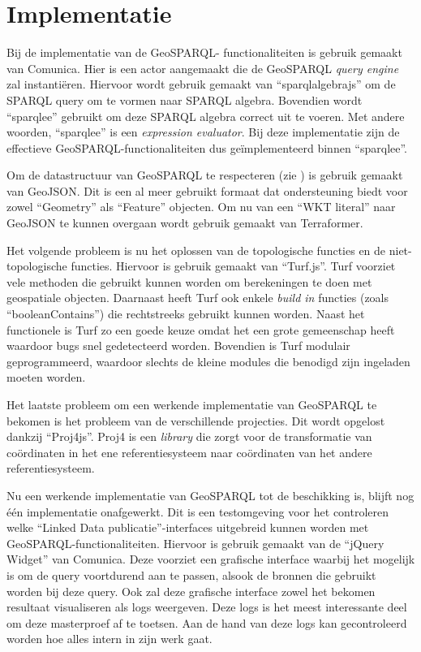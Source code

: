 \documentclass[twocolumn]{phdsymp} %
\begin{document}
\section{Implementatie}
Bij de implementatie van de GeoSPARQL- functionaliteiten is gebruik gemaakt van Comunica. Hier is een actor aangemaakt die de GeoSPARQL \textit{query engine} zal instantiëren. Hiervoor wordt gebruik gemaakt van ``sparqlalgebrajs'' om de SPARQL query om te vormen naar SPARQL algebra. Bovendien wordt ``sparqlee'' gebruikt om deze SPARQL algebra correct uit te voeren. Met andere woorden, ``sparqlee'' is een \textit{expression evaluator}. Bij deze implementatie zijn de effectieve GeoSPARQL-functionaliteiten dus geïmplementeerd binnen ``sparqlee''. 

Om de datastructuur van GeoSPARQL te respecteren (zie ) is gebruik gemaakt van GeoJSON. Dit is een al meer gebruikt formaat dat ondersteuning biedt voor zowel ``Geometry'' als ``Feature'' objecten. Om nu van een ``WKT literal'' naar GeoJSON te kunnen overgaan wordt gebruik gemaakt van Terraformer. 

Het volgende probleem is nu het oplossen van de topologische functies en de niet-topologische functies. Hiervoor is gebruik gemaakt van ``Turf.js''. Turf voorziet vele methoden die gebruikt kunnen worden om berekeningen te doen met geospatiale objecten. Daarnaast heeft Turf ook enkele \textit{build in} functies (zoals ``booleanContains'') die rechtstreeks gebruikt kunnen worden. Naast het functionele is Turf zo een goede keuze omdat het een grote gemeenschap heeft waardoor bugs snel gedetecteerd worden. Bovendien is Turf modulair geprogrammeerd, waardoor slechts de kleine modules die benodigd zijn ingeladen moeten worden. 

Het laatste probleem om een werkende implementatie van GeoSPARQL te bekomen is het probleem van de verschillende projecties. Dit wordt opgelost dankzij ``Proj4js''. Proj4 is een \textit{library} die zorgt voor de transformatie van coördinaten in het ene referentiesysteem naar coördinaten van het andere referentiesysteem. 

Nu een werkende implementatie van GeoSPARQL tot de beschikking is, blijft nog één implementatie onafgewerkt. Dit is een testomgeving voor het controleren welke ``Linked Data publicatie''-interfaces uitgebreid kunnen worden met GeoSPARQL-functionaliteiten. Hiervoor is gebruik gemaakt van de ``jQuery Widget'' van Comunica. Deze voorziet een grafische interface waarbij het mogelijk is om de query voortdurend aan te passen, alsook de bronnen die gebruikt worden bij deze query. Ook zal deze grafische interface zowel het bekomen resultaat visualiseren als logs weergeven. Deze logs is het meest interessante deel om deze masterproef af te toetsen. Aan de hand van deze logs kan gecontroleerd worden hoe alles intern in zijn werk gaat. 
\end{document}
